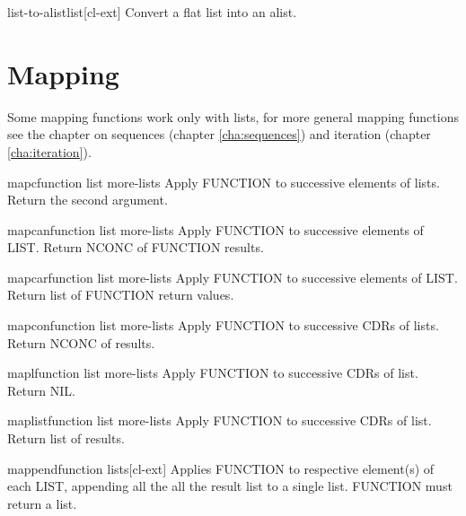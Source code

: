 \documentclass[10pt,english]{book}
\begin{document}
\begin{function}{list-to-alist}{list}[cl-ext]
  Convert a flat list into an alist.
\end{function}

\section{Mapping}
\label{sec:mapping}

Some mapping functions work only with lists, for more general mapping
functions see the chapter on sequences (chapter \ref{cha:sequences}) and
iteration (chapter \ref{cha:iteration}).

\begin{function}{mapc}{function list \rest more-lists}
  Apply FUNCTION to successive elements of lists. Return the second argument.
\end{function}

\begin{function}{mapcan}{function list \rest more-lists}
  Apply FUNCTION to successive elements of LIST. Return NCONC of FUNCTION
   results.
\end{function}

\begin{function}{mapcar}{function list \rest more-lists}
  Apply FUNCTION to successive elements of LIST. Return list of FUNCTION
   return values.
\end{function}

\begin{function}{mapcon}{function list \rest more-lists}
  Apply FUNCTION to successive CDRs of lists. Return NCONC of results.
\end{function}

\begin{function}{mapl}{function list \rest more-lists}
  Apply FUNCTION to successive CDRs of list. Return NIL.
\end{function}

\begin{function}{maplist}{function list \rest more-lists}
  Apply FUNCTION to successive CDRs of list. Return list of results.
\end{function}

\begin{function}{mappend}{function \rest lists}[cl-ext]
  Applies FUNCTION to respective element(s) of each LIST, appending all the
all the result list to a single list. FUNCTION must return a list.
\end{function}
\end{document}
